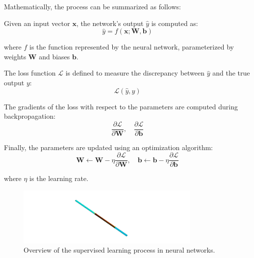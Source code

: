 \documentclass{report}
\begin{document}
        \noindent Mathematically, the process can be summarized as follows:

        \vspace{1em} \noindent Given an input vector \( \mathbf{x} \), the network's output \( \hat{y} \) is computed as:
        \begin{equation}
        \hat{y} = f(\mathbf{x}; \mathbf{W}, \mathbf{b})
        \end{equation}

        \noindent where \( f \) is the function represented by the neural network, parameterized by weights \( \mathbf{W} \) and biases \( \mathbf{b} \).

        \vspace{1em} \noindent The loss function \( \mathcal{L} \) is defined to measure the discrepancy between \( \hat{y} \) and the true output \( y \):
        \begin{equation}
        \mathcal{L}(\hat{y}, y)
        \end{equation}

        \vspace{1em} \noindent The gradients of the loss with respect to the parameters are computed during backpropagation:
        \begin{equation}
        \frac{\partial \mathcal{L}}{\partial \mathbf{W}}, \quad \frac{\partial \mathcal{L}}{\partial \mathbf{b}}
        \end{equation}

        \noindent Finally, the parameters are updated using an optimization algorithm:
        \begin{equation}
        \mathbf{W} \leftarrow \mathbf{W} - \eta \frac{\partial \mathcal{L}}{\partial \mathbf{W}}, \quad \mathbf{b} \leftarrow \mathbf{b} - \eta \frac{\partial \mathcal{L}}{\partial \mathbf{b}}
        \end{equation}

        \noindent where \( \eta \) is the learning rate.

    \begin{figure}[h]
        \centering
        \includegraphics[width=0.8\textwidth]{00_Images/00_Velocity.png}
        \caption{Overview of the supervised learning process in neural networks.}
        \label{fig:supervised_learning}
    \end{figure}
\end{document}
